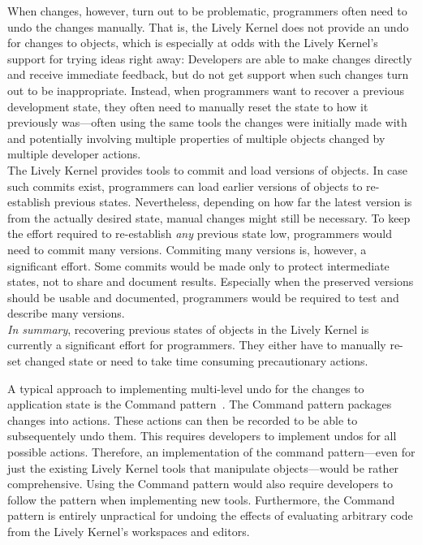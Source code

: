 When changes, however, turn out to be problematic, programmers often need to undo the changes manually.
That is, the Lively Kernel does not provide an undo for changes to objects, which is especially at odds with the Lively Kernel's support for trying ideas right away: Developers are able to make changes directly and receive immediate feedback, but do not get support when such changes turn out to be inappropriate.
Instead, when programmers want to recover a previous development state, they often need to manually reset the state to how it previously was---often using the same tools the changes were initially made with and potentially involving multiple properties of multiple objects changed by multiple developer actions.\\
The Lively Kernel provides tools to commit and load versions of objects.
In case such commits exist, programmers can load earlier versions of objects to re-establish previous states.
Nevertheless, depending on how far the latest version is from the actually desired state, manual changes might still be necessary.
To keep the effort required to re-establish \emph{any} previous state low, programmers would need to commit many versions.
Commiting many versions is, however, a significant effort.
Some commits would be made only to protect intermediate states, not to share and document results.
Especially when the preserved versions should be usable and documented, programmers would be required to test and describe many versions.\\
\emph{In summary}, recovering previous states of objects in the Lively Kernel is currently a significant effort for programmers.
They either have to manually re-set changed state or need to take time consuming precautionary actions.

A typical approach to implementing multi-level undo for the changes to application state is the Command pattern~\cite{GammaHelmJohnsonVlissides95}.
The Command pattern packages changes into actions.
These actions can then be recorded to be able to subsequentely undo them.
This requires developers to implement undos for all possible actions.
Therefore, an implementation of the command pattern---even for just the existing Lively Kernel tools that manipulate objects---would be rather comprehensive.
Using the Command pattern would also require developers to follow the pattern when implementing new tools.
Furthermore, the Command pattern is entirely unpractical for undoing the effects of evaluating arbitrary code from the Lively Kernel's workspaces and editors.

